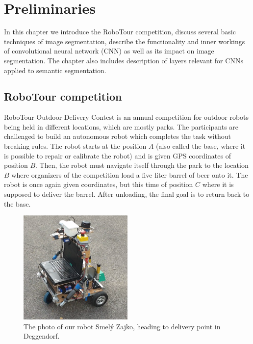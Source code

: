 \chapter{Preliminaries}
\label{chapter:preliminaries}

In this chapter we introduce the RoboTour competition,
discuss several basic techniques of image segmentation,
describe the functionality and inner workings of convolutional neural network (CNN) as well as 
its impact on image segmentation. The chapter also includes description of layers relevant
for CNNs applied to semantic segmentation.

\section{RoboTour competition}
\label{sec:robotour}

RoboTour Outdoor Delivery Contest is an annual competition for outdoor robots being held
in different locations, which are mostly parks.
The participants are challenged to build an autonomous robot which completes the task
without breaking rules. The robot starts at the position $A$
(also called the base, where it is possible to repair or calibrate the robot) and
is given GPS coordinates of position $B$. Then, the robot must navigate itself through
the park to the location $B$ where organizers of the competition load a five liter
barrel of beer onto it. The robot is once again given coordinates, but this time
of position $C$
where it is supposed to deliver the barrel. After unloading, the final goal is to return
back to the base.

\begin{figure}[!h]
	\centerline{\includegraphics[width=0.5\textwidth]{images/zajkophoto.png}}
	\caption[The photo of our robot Smelý Zajko]{The photo of our robot Smelý Zajko, heading to delivery point in Deggendorf.}
	\label{img:zajko}
\end{figure}

